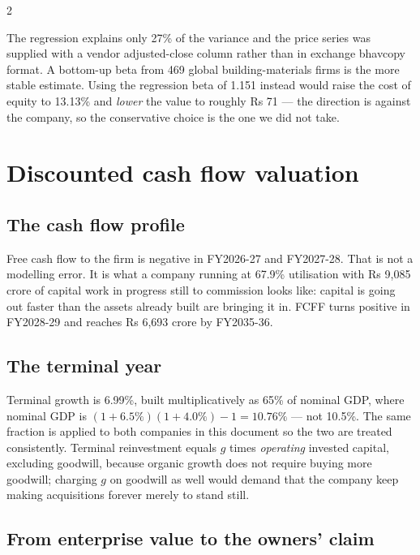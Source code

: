 \begin{paracol}{2}
\begin{notebox}
The regression explains only 27\% of the variance and the price series was supplied
with a vendor adjusted-close column rather than in exchange bhavcopy format. A
bottom-up beta from 469 global building-materials firms is the more stable estimate.
Using the regression beta of 1.151 instead would raise the cost of equity to 13.13\%
and \emph{lower} the value to roughly Rs 71 — the direction is against the company,
so the conservative choice is the one we did not take.
\end{notebox}

\switchcolumn*
\section{Discounted cash flow valuation}

\subsection{The cash flow profile}

Free cash flow to the firm is negative in FY2026-27 and FY2027-28. That is not a
modelling error. It is what a company running at 67.9\% utilisation with Rs 9,085
crore of capital work in progress still to commission looks like: capital is going
out faster than the assets already built are bringing it in. FCFF turns positive in
FY2028-29 and reaches Rs 6,693 crore by FY2035-36.

\subsection{The terminal year}

Terminal growth is 6.99\%, built multiplicatively as 65\% of nominal GDP, where
nominal GDP is $(1+6.5\%)(1+4.0\%)-1 = 10.76\%$ — not 10.5\%. The same fraction is
applied to both companies in this document so the two are treated consistently.
Terminal reinvestment equals $g$ times \emph{operating} invested capital, excluding
goodwill, because organic growth does not require buying more goodwill; charging
$g$ on goodwill as well would demand that the company keep making acquisitions
forever merely to stand still.

\subsection{From enterprise value to the owners' claim}


\end{paracol}
